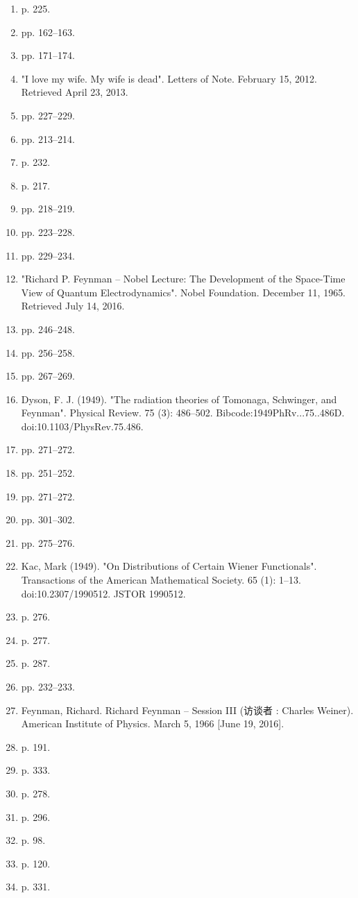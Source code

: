 \begin{enumerate}
\item  p. 225.
\item  pp. 162–163.
\item  pp. 171–174.
\item "I love my wife. My wife is dead". Letters of Note. February 15, 2012. Retrieved April 23, 2013.
\item  pp. 227–229.
\item  pp. 213–214.
\item  p. 232.
\item  p. 217.
\item  pp. 218–219.
\item  pp. 223–228.
\item  pp. 229–234.
\item "Richard P. Feynman – Nobel Lecture: The Development of the Space-Time View of Quantum Electrodynamics". Nobel Foundation. December 11, 1965. Retrieved July 14, 2016.
\item  pp. 246–248.
\item  pp. 256–258.
\item  pp. 267–269.
\item Dyson, F. J. (1949). "The radiation theories of Tomonaga, Schwinger, and Feynman". Physical Review. 75 (3): 486–502. Bibcode:1949PhRv...75..486D. doi:10.1103/PhysRev.75.486.
\item  pp. 271–272.
\item  pp. 251–252.
\item  pp. 271–272.
\item  pp. 301–302.
\item  pp. 275–276.
\item Kac, Mark (1949). "On Distributions of Certain Wiener Functionals". Transactions of the American Mathematical Society. 65 (1): 1–13. doi:10.2307/1990512. JSTOR 1990512.
\item  p. 276.
\item  p. 277.
\item  p. 287.
\item  pp. 232–233.
\item Feynman, Richard. Richard Feynman – Session III (访谈者 : Charles Weiner). American Institute of Physics. March 5, 1966 [June 19, 2016].
\item  p. 191.
\item  p. 333.
\item  p. 278.
\item  p. 296.
\item  p. 98.
\item  p. 120.
\item  p. 331.

\end{enumerate}
